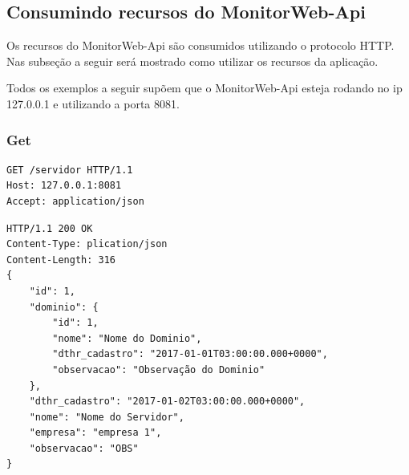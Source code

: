 \subsection{Consumindo recursos do MonitorWeb-Api}\label{subsec:ConsumindoRecursos}

Os recursos do MonitorWeb-Api são consumidos utilizando o protocolo HTTP. Nas subseção a seguir será mostrado como utilizar os recursos da aplicação.

Todos os exemplos a seguir supõem que o MonitorWeb-Api esteja rodando no ip 127.0.0.1 e utilizando a porta 8081. 

\subsubsection{Get}



\begin{lstlisting}[label=Func:GETExemplo,caption={[].}]
GET /servidor HTTP/1.1
Host: 127.0.0.1:8081
Accept: application/json
\end{lstlisting}


\begin{lstlisting}[label=Func:RespostaExemplo,caption={[]}]
HTTP/1.1 200 OK
Content-Type: plication/json
Content-Length: 316
{
    "id": 1,
    "dominio": {
        "id": 1,
        "nome": "Nome do Dominio",
        "dthr_cadastro": "2017-01-01T03:00:00.000+0000",
        "observacao": "Observação do Dominio"
    },
    "dthr_cadastro": "2017-01-02T03:00:00.000+0000",
    "nome": "Nome do Servidor",
    "empresa": "empresa 1",
    "observacao": "OBS"
}
\end{lstlisting}



